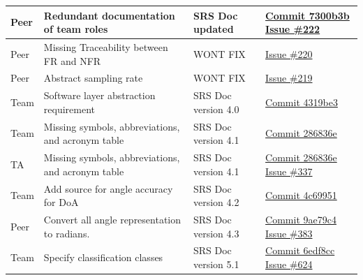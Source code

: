 \documentclass{article}
\begin{document}
\begin{longtable}{|p{2cm}|p{4.5cm}|p{3.5cm}|p{3cm}|}
    Peer &
    Redundant documentation of team roles &
    SRS Doc updated& 
    \href{https://github.com/Team6-SixSense/audio360/commit/7300b3b}{Commit
        7300b3b}
    \newline
    \href{https://github.com/Team6-SixSense/audio360/issues/222}{Issue \#222} \\
    \hline

    Peer &
    Missing Traceability between FR and NFR &
    WONT FIX & 
    \href{https://github.com/Team6-SixSense/audio360/issues/220}{Issue \#220} \\
    \hline

    Peer &
    Abstract sampling rate &
    WONT FIX & 
    \href{https://github.com/Team6-SixSense/audio360/issues/219}{Issue \#219} \\
    \hline

    Team &
    Software layer abstraction requirement &
    SRS Doc version 4.0 & 
    \href{https://github.com/Team6-SixSense/audio360/commit/4319be3}{Commit
        4319be3} \\
    \hline

    Team &
    Missing symbols, abbreviations, and acronym table &
    SRS Doc version 4.1 & 
    \href{https://github.com/Team6-SixSense/audio360/commit/286836e}{Commit
        286836e} \\
    \hline

    TA &
    Missing symbols, abbreviations, and acronym table &
    SRS Doc version 4.1 & 
    \href{https://github.com/Team6-SixSense/audio360/commit/286836e}{Commit
        286836e} 
    \newline
    \href{https://github.com/Team6-SixSense/audio360/issues/337}{Issue \#337} \\
    \hline

    Team &
    Add source for angle accuracy for DoA &
    SRS Doc version 4.2 & 
    \href{https://github.com/Team6-SixSense/audio360/commit/4c69951}{Commit
        4c69951} \\
    \hline

    Peer &
    Convert all angle representation to radians. &
    SRS Doc version 4.3 & 
    \href{https://github.com/Team6-SixSense/audio360/commit/9ae79c4}{Commit
        9ae79c4}
    \newline
    \href{https://github.com/Team6-SixSense/audio360/issues/383}{Issue \#383} \\
    \hline

    Team &
    Specify classification classes &
    SRS Doc version 5.1 & 
    \href{https://github.com/Team6-SixSense/audio360/commit/6edf8cc}{Commit
        6edf8cc}
    \newline
    \href{https://github.com/Team6-SixSense/audio360/issues/624}{Issue \#624} \\
    \hline


\end{longtable}
\end{document}
